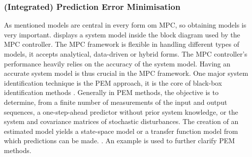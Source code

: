 \subsubsection*{(Integrated) Prediction Error Minimisation}
As mentioned models are central in every form om \ac{MPC}, so obtaining models is very important.  displays a system model inside the block diagram used by the \ac{MPC} controller. The \ac{MPC} framework is flexible in handling different types of models, it accepts analytical, data-driven or hybrid forms. The \ac{MPC} controller's performance heavily relies on the accuracy of the system model. Having an accurate system model is thus crucial in the \ac{MPC} framework. One major system identification technique is the \ac{PEM} approach, it is the core of black-box identification methods \cite{farina_convergence_2008}. Generally in \ac{PEM} methods, the objective is to determine, from a finite number of measurements of the input and output sequences, a one-step-ahead predictor without prior system knowledge, or the system and covariance matrices of stochastic disturbances. The creation of an estimated model yields a state-space model or a transfer function model from which predictions can be made. \cite{verhaegen_filtering_2007}. An example is used to further clarify \ac{PEM} methods.

